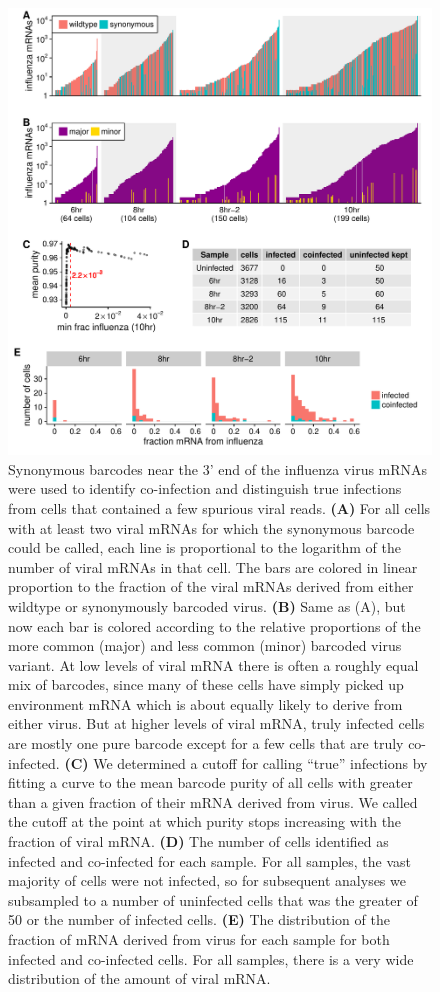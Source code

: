 \documentclass[9pt,lineno]{elife}
\begin{document}
\begin{figure}
\includegraphics[width=\linewidth]{figures/p_frac_flu_summary.pdf}
\caption{
Synonymous barcodes near the 3' end of the influenza virus mRNAs were used to identify co-infection and distinguish true infections from cells that contained a few spurious viral reads.
{\bf (A)}
For all cells with at least two viral mRNAs for which the synonymous barcode could be called, each line is proportional to the logarithm of the number of viral mRNAs in that cell.
The bars are colored in linear proportion to the fraction of the viral mRNAs derived from either wildtype or synonymously barcoded virus.
{\bf (B)}
Same as (A), but now each bar is colored according to the relative proportions of the more common (major) and less common (minor) barcoded virus variant.
At low levels of viral mRNA there is often a roughly equal mix of barcodes, since many of these cells have simply picked up environment mRNA which is about equally likely to derive from either virus.
But at higher levels of viral mRNA, truly infected cells are mostly one pure barcode except for a few cells that are truly co-infected.
{\bf (C)}
We determined a cutoff for calling ``true'' infections by fitting a curve to the mean barcode purity of all cells with greater than a given fraction of their mRNA derived from virus.
We called the cutoff at the point at which purity stops increasing with the fraction of viral mRNA.
{\bf (D)}
The number of cells identified as infected and co-infected for each sample.
For all samples, the vast majority of cells were not infected, so for subsequent analyses we subsampled to a number of uninfected cells that was the greater of 50 or the number of infected cells.
{\bf (E)} 
The distribution of the fraction of mRNA derived from virus for each sample for both infected and co-infected cells.
For all samples, there is a very wide distribution of the amount of viral mRNA.
}
\label{fig:fracflu}
\end{figure}
\end{document}
